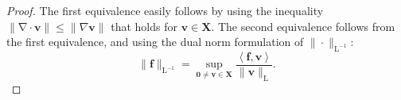 \documentclass[10pt,a4paper]{amsart}
\newcommand{\Linvmap}{\mathrm{L^{-1}}}
\newcommand{\Lmap}{\mathrm{L}}
\def\V#1{\mathbf{#1}}
\newcommand{\divergence}{\mathrm{\nabla \cdot}}
\begin{document}
\begin{proof}
    The first equivalence easily follows by using the inequality $\|\divergence \V{v}\| \le \|\nabla \V{v}\|$ that holds for $\V{v} \in \V{X}$. The second equivalence follows from the first equivalence, and using the dual norm formulation of $\| \cdot \|_\Linvmap$:
    \begin{equation}
        \label{eq:DualNorm}
        \| \V{f} \|_\Linvmap = \sup\limits_{\V{0} \neq \V{v} \in \V{X}}\frac{\left\langle \V{f},\V{v} \right\rangle}{\| \V{v} \|_{\Lmap}}.
    \end{equation}
\end{proof}
\end{document}
